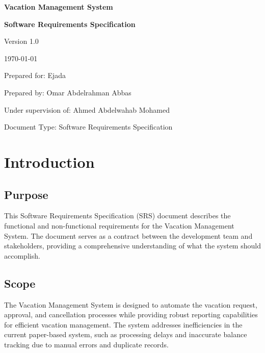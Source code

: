 \documentclass[12pt,a4paper]{article}
\begin{document}
\begin{titlepage}
\centering
\vspace*{2cm}
{\Huge\bfseries Vacation Management System\par}
\vspace{1cm}
{\Large\bfseries Software Requirements Specification\par}
\vspace{2cm}
{\large Version 1.0\par}
\vspace{1cm}
{\large \today\par}
\vspace{2cm}
{\large Prepared for: Ejada\par}
\vspace{1cm}
{\large Prepared by: Omar Abdelrahman Abbas\par}
\vspace{1cm}
{\large Under supervision of: Ahmed Abdelwahab Mohamed\par}
\vspace{1cm}
{\large Document Type: Software Requirements Specification\par}
\vfill
\end{titlepage}

\tableofcontents
\newpage

\listoffigures
\newpage

\listoftables
\newpage

\section{Introduction}

\subsection{Purpose}
This Software Requirements Specification (SRS) document describes the functional and non-functional requirements for the Vacation Management System. The document serves as a contract between the development team and stakeholders, providing a comprehensive understanding of what the system should accomplish.

\subsection{Scope}
The Vacation Management System is designed to automate the vacation request, approval, and cancellation processes while providing robust reporting capabilities for efficient vacation management. The system addresses inefficiencies in the current paper-based system, such as processing delays and inaccurate balance tracking due to manual errors and duplicate records.
\end{document}
